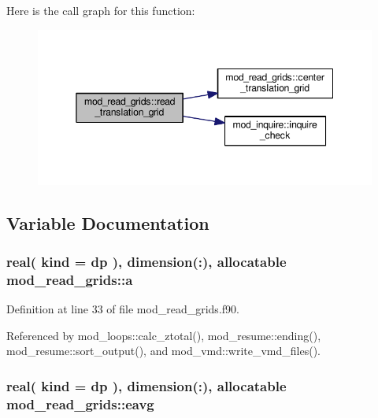 Here is the call graph for this function\+:\nopagebreak
\begin{figure}[H]
\begin{center}
\leavevmode
\includegraphics[width=345pt]{namespacemod__read__grids_af6cb0bee8e3eb7dfbaa4621275b29fa2_cgraph}
\end{center}
\end{figure}




\subsection{Variable Documentation}
\subsubsection[{\texorpdfstring{a}{a}}]{\setlength{\rightskip}{0pt plus 5cm}real( kind = dp ), dimension(\+:), allocatable mod\+\_\+read\+\_\+grids\+::a}\hypertarget{namespacemod__read__grids_a1cd0dd1119fe3ce58917bf6aaf7abebf}{}\label{namespacemod__read__grids_a1cd0dd1119fe3ce58917bf6aaf7abebf}


Definition at line 33 of file mod\+\_\+read\+\_\+grids.\+f90.



Referenced by mod\+\_\+loops\+::calc\+\_\+ztotal(), mod\+\_\+resume\+::ending(), mod\+\_\+resume\+::sort\+\_\+output(), and mod\+\_\+vmd\+::write\+\_\+vmd\+\_\+files().

\subsubsection[{\texorpdfstring{eavg}{eavg}}]{\setlength{\rightskip}{0pt plus 5cm}real( kind = dp ), dimension(\+:), allocatable mod\+\_\+read\+\_\+grids\+::eavg}\hypertarget{namespacemod__read__grids_af9747d65a3c7dd6876ab803f0a06e8e9}{}\label{namespacemod__read__grids_af9747d65a3c7dd6876ab803f0a06e8e9}


